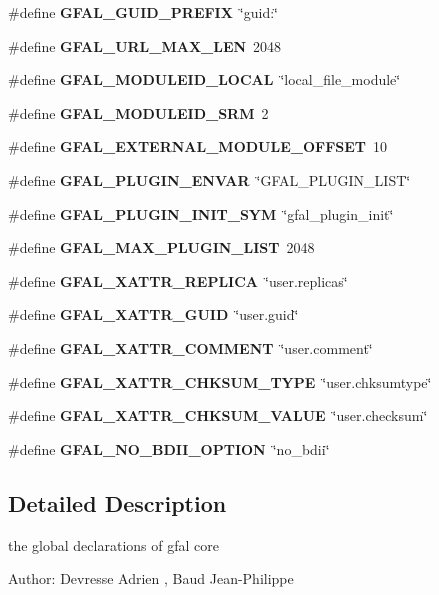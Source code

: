 \begin{CompactItemize}
\item 
\#define \textbf{GFAL\_\-GUID\_\-PREFIX}~\char`\"{}guid:\char`\"{}\label{gfal__constants_8h_9adb5dc8efeaa3454b32e2f67309e36f}

\item 
\#define \textbf{GFAL\_\-URL\_\-MAX\_\-LEN}~2048\label{gfal__constants_8h_8aeca034bb7345f07b3b736501168cdd}

\item 
\#define \textbf{GFAL\_\-MODULEID\_\-LOCAL}~\char`\"{}local\_\-file\_\-module\char`\"{}\label{gfal__constants_8h_6843a99bf27c1e7f0ea245ba0a4b4638}

\item 
\#define \textbf{GFAL\_\-MODULEID\_\-SRM}~2\label{gfal__constants_8h_81086ad079cc0d38b02e33018b11cb78}

\item 
\#define \textbf{GFAL\_\-EXTERNAL\_\-MODULE\_\-OFFSET}~10\label{gfal__constants_8h_c3acf68b834fb0400f412735badbe8bb}

\item 
\#define \textbf{GFAL\_\-PLUGIN\_\-ENVAR}~\char`\"{}GFAL\_\-PLUGIN\_\-LIST\char`\"{}\label{gfal__constants_8h_c414ec8b2ed505d8318b1102ea3dd987}

\item 
\#define \textbf{GFAL\_\-PLUGIN\_\-INIT\_\-SYM}~\char`\"{}gfal\_\-plugin\_\-init\char`\"{}\label{gfal__constants_8h_6549284d505729b12a761cbb6c3914f5}

\item 
\#define \textbf{GFAL\_\-MAX\_\-PLUGIN\_\-LIST}~2048\label{gfal__constants_8h_8b50ed92a1ea58484de650f667db28f1}

\item 
\#define \textbf{GFAL\_\-XATTR\_\-REPLICA}~\char`\"{}user.replicas\char`\"{}\label{gfal__constants_8h_99cf748c03f297ef6e429cbd2dfe3c35}

\item 
\#define \textbf{GFAL\_\-XATTR\_\-GUID}~\char`\"{}user.guid\char`\"{}\label{gfal__constants_8h_a395dff27be0cd2e43081098f5c68833}

\item 
\#define \textbf{GFAL\_\-XATTR\_\-COMMENT}~\char`\"{}user.comment\char`\"{}\label{gfal__constants_8h_43f447aa0c1b5fe95a4c79b23c770952}

\item 
\#define \textbf{GFAL\_\-XATTR\_\-CHKSUM\_\-TYPE}~\char`\"{}user.chksumtype\char`\"{}\label{gfal__constants_8h_fc6ffd43ad73ab219155b61c02405aec}

\item 
\#define \textbf{GFAL\_\-XATTR\_\-CHKSUM\_\-VALUE}~\char`\"{}user.checksum\char`\"{}\label{gfal__constants_8h_2e084155870841ad60f7353089f3bdf4}

\item 
\#define \textbf{GFAL\_\-NO\_\-BDII\_\-OPTION}~\char`\"{}no\_\-bdii\char`\"{}\label{gfal__constants_8h_992716aa0db1782d63f1fa57fd7f7d19}

\end{CompactItemize}


\subsection{Detailed Description}
the global declarations of gfal core \begin{Desc}
\item[Author:]Devresse Adrien , Baud Jean-Philippe \end{Desc}
